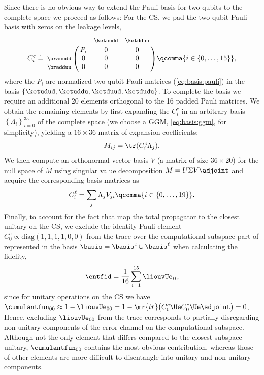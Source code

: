 Since there is no obvious way to extend the Pauli basis for two qubits to the complete space we proceed as follows: For the CS, we pad the two-qubit Pauli basis with zeros on the leakage levels, \ie
\begin{equation}\label{eq:basis:cnot}
    C_i^c\doteq\bordermatrix{~                       &     & \footnotesize{\ketuudd} & \footnotesize{\ketdduu} \cr
                                                     & P_i & 0                       & 0                       \cr
                             \footnotesize{\brauudd} & 0   & 0                       & 0                       \cr
                             \footnotesize{\bradduu} & 0   & 0                       & 0                       \cr}
    \qcomma{i\in\{0,\dotsc,15\}},
\end{equation}
where the $P_i$ are normalized two-qubit Pauli matrices (\cf \cref{eq:basis:pauli}) in the basis $\lbrace\ketudud,\ketuddu,\ketduud,\ketdudu\rbrace$. To complete the basis we require an additional 20 elements orthogonal to the 16 padded Pauli matrices. We obtain the remaining elements by first expanding the $C_i^c$ in an arbitrary basis $\left\lbrace\Lambda_i\right\rbrace_{i=0}^{35}$ of the complete space (we choose a GGM, \cf \cref{eq:basis:ggm}, for simplicity), yielding a $16\times 36$ matrix of expansion coefficients:
\begin{equation}
    M_{ij} = \tr(C_i^c\Lambda_j).
\end{equation}
We then compute an orthonormal vector basis $V$ (a matrix of size $36\times 20$) for the null space of $M$ using singular value decomposition $M = U\Sigma V\adjoint$ and acquire the corresponding basis matrices as
\begin{equation}
    C_i^\ell = \sum_j\Lambda_j V_{ji}\qcomma{i\in\lbrace 0,\dotsc,19\rbrace}.
\end{equation}
Finally, to account for the fact that  map the total propagator to the closest unitary on the CS, we exclude the identity Pauli element $C_0^c\propto\text{diag}(1, 1, 1, 1, 0, 0)$ from the trace over the computational subspace part of \liouvUe represented in the basis $\basis = \basis^c\cup\basis^\ell$ when calculating the fidelity,
\begin{equation}
    \entfid = \frac{1}{16}\sum_{i=1}^{15}\liouvUe_{ii},
\end{equation}
since for unitary operations on the CS we have $\cumulantfun_{00} \approx 1 - \liouvUe_{00} = 1 - \mr{tr}\bigl(C_0^c\Ue C_0^c\Ue\adjoint\bigr) = 0$. Hence, excluding $\liouvUe_{00}$ from the trace corresponds to partially disregarding non-unitary components of the error channel on the computational subspace. Although not the only element that differs compared to the closest subspace unitary, $\cumulantfun_{00}$ contains the most obvious contribution, whereas those of other elements are more difficult to disentangle into unitary and non-unitary components.

